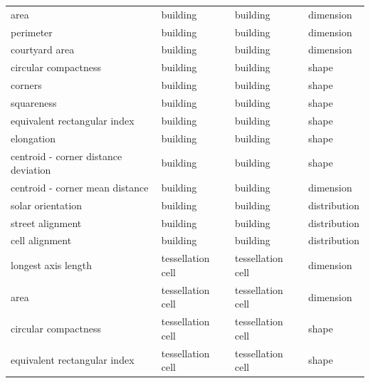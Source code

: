 \begin{longtable}{p{5cm}p{4cm}p{4cm}l}
\bottomrule
\endlastfoot
                                area &                        building &                   building &    dimension \\
                           perimeter &                        building &                   building &    dimension \\
                      courtyard area &                        building &                   building &    dimension \\
                circular compactness &                        building &                   building &        shape \\
                             corners &                        building &                   building &        shape \\
                          squareness &                        building &                   building &        shape \\
        equivalent rectangular index &                        building &                   building &        shape \\
                          elongation &                        building &                   building &        shape \\
centroid - corner distance deviation &                        building &                   building &        shape \\
     centroid - corner mean distance &                        building &                   building &    dimension \\
                   solar orientation &                        building &                   building & distribution \\
                    street alignment &                        building &                   building & distribution \\
                      cell alignment &                        building &                   building & distribution \\
                 longest axis length &               tessellation cell &          tessellation cell &    dimension \\
                                area &               tessellation cell &          tessellation cell &    dimension \\
                circular compactness &               tessellation cell &          tessellation cell &        shape \\
        equivalent rectangular index &               tessellation cell &          tessellation cell &        shape \\

\end{longtable}
